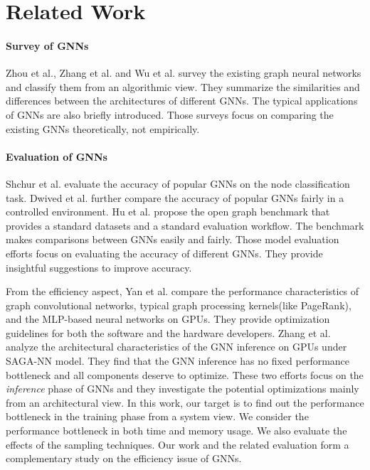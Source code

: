 \section{Related Work}
\label{sec:related_work}

\paragraph{Survey of GNNs}
Zhou et al.\cite{zhou2018_gnn_review}, Zhang et al.\cite{zhang2018_gnn_survey} and Wu et al.\cite{comprehensive-survey-wu-2020} survey the existing graph neural networks and classify them from an algorithmic view.
They summarize the similarities and differences between the architectures of different GNNs.
The typical applications of GNNs are also briefly introduced.
Those surveys focus on comparing the existing GNNs theoretically, not empirically.

\paragraph{Evaluation of GNNs}
Shchur et al. \cite{shchur2018_pitfall_of_gnn} evaluate the accuracy of popular GNNs on the node classification task.
Dwived et al. \cite{dwivedi2020_benchmark_of_gnn} further compare the accuracy of popular GNNs fairly in a controlled environment.
Hu et al. \cite{hu2020_open_graph_benchmark} propose the open graph benchmark that provides a standard datasets and a standard evaluation workflow.
The benchmark makes comparisons between GNNs easily and fairly.
Those model evaluation efforts focus on evaluating the accuracy of different GNNs.
They provide insightful suggestions to improve accuracy.

From the efficiency aspect, Yan et al. \cite{yan2020_characterizing_gcn} compare the performance characteristics of graph convolutional networks, typical graph processing kernels(like PageRank), and the MLP-based neural networks on GPUs.
They provide optimization guidelines for both the software and the hardware developers.
Zhang et al. \cite{zhang2020_analysis_neugraph} analyze the architectural characteristics of the GNN inference on GPUs under SAGA-NN \cite{ma2019_neugraph} model.
They find that the GNN inference has no fixed performance bottleneck and all components deserve to optimize.
These two efforts focus on the \emph{inference} phase of GNNs and they investigate the potential optimizations mainly from an architectural view.
In this work, our target is to find out the performance bottleneck in the training phase from a system view.
We consider the performance bottleneck in both time and memory usage.
We also evaluate the effects of the sampling techniques.
Our work and the related evaluation\cite{yan2020_characterizing_gcn, zhang2020_analysis_neugraph} form a complementary study on the efficiency issue of GNNs.

